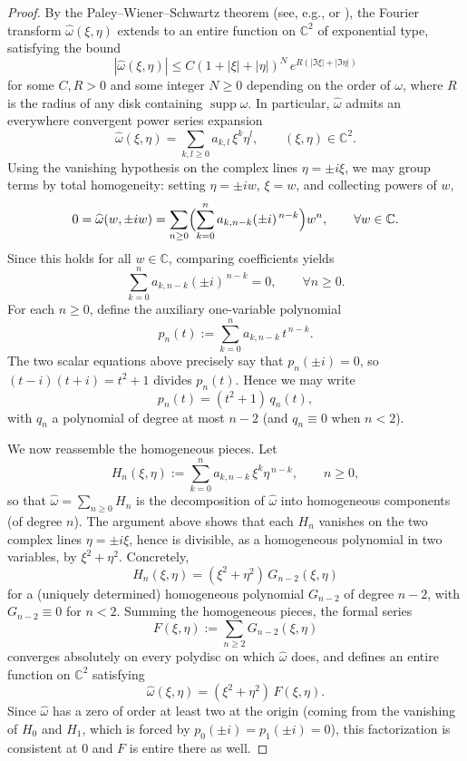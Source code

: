 \documentclass[a4paper,11pt,reqno]{amsart}
\numberwithin{equation}{section}
\theoremstyle{plain} %
\theoremstyle{definition} %
\theoremstyle{remark}
\newcommand{\C}{\mathbb{C}}
\begin{document}
\begin{proof}
By the Paley--Wiener--Schwartz theorem (see, e.g.,
\cite[Theorem~7.3.1]{Hormander} or \cite[\S 9.3]{Folland}), the Fourier
transform $\widehat\omega(\xi,\eta)$ extends to an entire function on $\C^2$
of exponential type, satisfying the bound
\[
|\widehat\omega(\xi,\eta)|\le C(1+|\xi|+|\eta|)^{N}\,e^{R(|\Im\xi|+|\Im\eta|)}
\]
for some $C,R>0$ and some integer $N\ge 0$ depending on the order of
$\omega$, where $R$ is the radius of any disk containing
$\operatorname{supp}\omega$. In particular, $\widehat\omega$ admits an
everywhere convergent power series expansion
\[
\widehat{\omega}(\xi,\eta)=\sum_{k,l\ge 0} a_{k,l}\,\xi^k\eta^l,
\qquad (\xi,\eta)\in\C^2.
\]
Using the vanishing hypothesis on the complex lines $\eta=\pm i\xi$, we may
group terms by total homogeneity: setting $\eta=\pm iw$, $\xi=w$, and
collecting powers of $w$,
\[
0=\widehat{\omega}(w,\pm iw)
   =\sum_{n\ge 0}\Bigl(\sum_{k=0}^n a_{k,n-k}(\pm i)^{\,n-k}\Bigr)w^n,
\qquad \forall w\in\C.
\]
Since this holds for all $w\in\C$, comparing coefficients yields
\[
\sum_{k=0}^n a_{k,n-k}(\pm i)^{\,n-k}=0,\qquad \forall n\ge 0.
\]
For each $n\ge 0$, define the auxiliary one-variable polynomial
\[
p_n(t):=\sum_{k=0}^n a_{k,n-k}\, t^{\,n-k}.
\]
The two scalar equations above precisely say that $p_n(\pm i)=0$, so
$(t-i)(t+i)=t^2+1$ divides $p_n(t)$. Hence we may write
\[
p_n(t)=(t^2+1)\,q_n(t),
\]
with $q_n$ a polynomial of degree at most $n-2$ (and $q_n\equiv 0$ when
$n<2$).

We now reassemble the homogeneous pieces. Let
\[
H_n(\xi,\eta):=\sum_{k=0}^n a_{k,n-k}\,\xi^k\eta^{\,n-k},
\qquad n\ge 0,
\]
so that $\widehat\omega=\sum_{n\ge 0}H_n$ is the decomposition of
$\widehat\omega$ into homogeneous components (of degree $n$). The argument
above shows that each $H_n$ vanishes on the two complex lines
$\eta=\pm i\xi$, hence is divisible, as a homogeneous polynomial in two
variables, by $\xi^2+\eta^2$. Concretely,
\[
H_n(\xi,\eta)=(\xi^2+\eta^2)\,G_{n-2}(\xi,\eta)
\]
for a (uniquely determined) homogeneous polynomial $G_{n-2}$ of degree
$n-2$, with $G_{n-2}\equiv 0$ for $n<2$. Summing the homogeneous pieces, the
formal series
\[
F(\xi,\eta):=\sum_{n\ge 2} G_{n-2}(\xi,\eta)
\]
converges absolutely on every polydisc on which $\widehat\omega$ does, and
defines an entire function on $\C^2$ satisfying
\[
\widehat{\omega}(\xi,\eta)=(\xi^2+\eta^2)\,F(\xi,\eta).
\]
Since $\widehat\omega$ has a zero of order at least two at the origin
(coming from the vanishing of $H_0$ and $H_1$, which is forced by
$p_0(\pm i)=p_1(\pm i)=0$), this factorization is consistent at $0$ and $F$
is entire there as well.


\end{proof}
\end{document}
